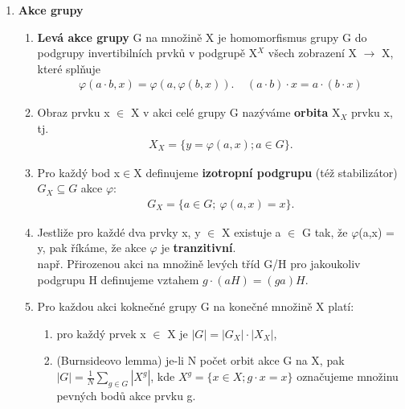 \documentclass[12pt,a4paper]{article}
\begin{document}
\begin{enumerate}
		\item \textbf{Akce grupy}
		
		\begin{enumerate}
			\item \textbf{Levá akce grupy} G na množině X je homomorfismus grupy G do podgrupy invertibilních prvků v podgrupě X$^X$ všech zobrazení X $\rightarrow$ X, které splňuje 
			\begin{align*}
			\varphi(a\cdot b,x) = \varphi(a,\varphi(b,x)).\	\ \ \ \	(a\cdot b)\cdot x = a\cdot (b\cdot x)
			\end{align*} 
			

			\item Obraz prvku x $\in$ X v akci celé grupy G nazýváme \textbf{orbita} X$_X$ prvku x, tj.
			\begin{align*}
			X_X = \{y = \varphi(a,x); a\in G\}.
			\end{align*} 
			
			\item Pro každý bod x$\in$X definujeme \textbf{izotropní podgrupu} (též stabilizátor) $G_X \subseteq G$ akce $\varphi$:
			\begin{align*}
			G_X = \{a \in G;\ \varphi(a,x) =x\}.
			\end{align*}
			\item 
			Jestliže pro každé dva prvky x, y $\in$ X existuje a $\in$ G tak, že $\varphi$(a,x) = y, pak říkáme, že akce $\varphi$ je \textbf{tranzitivní}. \\
			např. Přirozenou akci na množině levých tříd G/H pro jakoukoliv podgrupu H definujeme vztahem $g\cdot (aH) = (ga) H$.
			
			\item Pro každou akci koknečné grupy G na konečné množině X platí:
			\begin{enumerate}
				\item pro každý prvek x $\in$ X je $|G| = |G_X|\cdot |X_X|$,
				\item (Burnsideovo lemma) je-li N počet orbit akce G na X, pak $|G| = \frac{1}{N}\sum_{g\in G}|X^g|$, kde $X^g = \{x \in X; g\cdot x = x\}$ označujeme množinu pevných bodů akce prvku g.
			\end{enumerate}
		\end{enumerate}


\end{enumerate}
\end{document}

